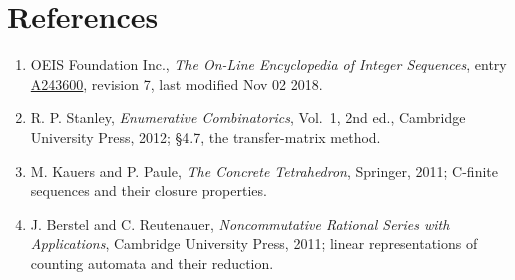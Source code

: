 \documentclass[11pt]{article}
\theoremstyle{definition}
\begin{document}
\section{References}

\begin{enumerate}

\item OEIS Foundation Inc., \emph{The On-Line Encyclopedia of Integer Sequences}, entry \href{https://oeis.org/A243600}{A243600}, revision 7, last modified Nov 02 2018.

\item R. P. Stanley, \emph{Enumerative Combinatorics}, Vol.~1, 2nd ed., Cambridge University Press, 2012; \S4.7, the transfer-matrix method.

\item M. Kauers and P. Paule, \emph{The Concrete Tetrahedron}, Springer, 2011; C-finite sequences and their closure properties.

\item J. Berstel and C. Reutenauer, \emph{Noncommutative Rational Series with Applications}, Cambridge University Press, 2011; linear representations of counting automata and their reduction.

\end{enumerate}
\end{document}
